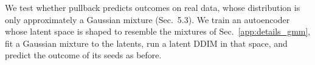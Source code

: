 
We test whether pullback predicts outcomes on real data, whose distribution is only approximately a
Gaussian mixture (Sec.~5.3). We train an autoencoder whose latent space is shaped to resemble the
mixtures of Sec.~\ref{app:details_gmm}, fit a Gaussian mixture to the latents, run a latent DDIM in
that space, and predict the outcome of its seeds as before.

